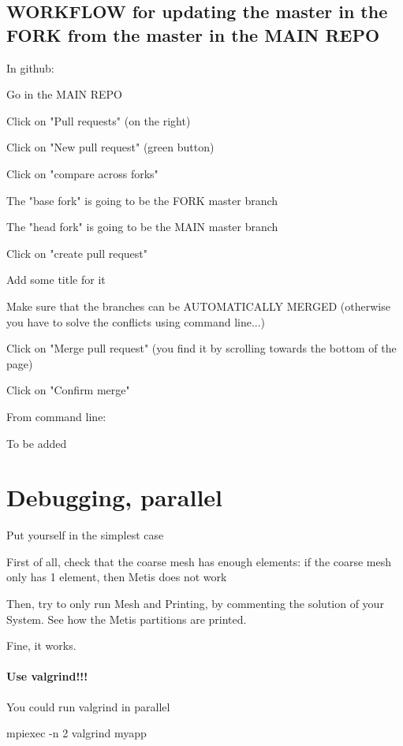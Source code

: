 \documentclass[10pt]{book}
\begin{document}
\section{WORKFLOW for updating the master in the FORK from the master in the MAIN REPO}


In github:

Go in the MAIN REPO

Click on "Pull requests" (on the right)

Click on "New pull request" (green button)

Click on "compare across forks"

The "base fork" is going to be the FORK master branch

The "head fork" is going to be the MAIN master branch

Click on "create pull request"

Add some title for it

Make sure that the branches can be AUTOMATICALLY MERGED (otherwise you have to solve the conflicts using command 
line...)

Click on "Merge pull request" (you find it by scrolling towards the bottom of the page)

Click on "Confirm merge"

From command line:

To be added

 
 
  \chapter{Debugging, parallel}
 
 Put yourself in the simplest case
 
 First of all, check that the coarse mesh has enough elements: if the coarse mesh only has 1 element, then Metis does not work
 
 Then, try to only run Mesh and Printing, by commenting the solution of your System. See how the Metis partitions are printed.
 
 Fine, it works.
 
  \subsubsection{Use valgrind!!!}
  
  You could run valgrind in parallel
  
 mpiexec -n 2 valgrind myapp
  
  
\end{document}
